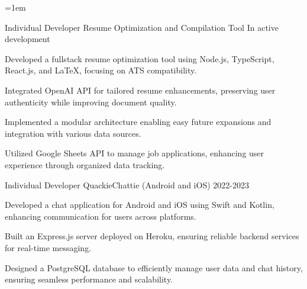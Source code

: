 \emergencystretch=1em   %
\sloppy                 %

\begin{cventries}

          \cventry
            {Individual Developer} %
            {Resume Optimization and Compilation Tool} %
            {} %
            {In active development} %
            {
              \begin{cvitems} %
              \item {Developed a fullstack resume optimization tool using Node.js, TypeScript, React.js, and LaTeX, focusing on ATS compatibility.}
    \item {Integrated OpenAI API for tailored resume enhancements, preserving user authenticity while improving document quality.}
    \item {Implemented a modular architecture enabling easy future expansions and integration with various data sources.}
    \item {Utilized Google Sheets API to manage job applications, enhancing user experience through organized data tracking.}
              \end{cvitems}
            }

          \cventry
            {Individual Developer} %
            {QuackieChattie (Android and iOS)} %
            {} %
            {2022-2023} %
            {
              \begin{cvitems} %
              \item {Developed a chat application for Android and iOS using Swift and Kotlin, enhancing communication for users across platforms.}
    \item {Built an Express.js server deployed on Heroku, ensuring reliable backend services for real-time messaging.}
    \item {Designed a PostgreSQL database to efficiently manage user data and chat history, ensuring seamless performance and scalability.}
              \end{cvitems}
            }


\end{cventries}
